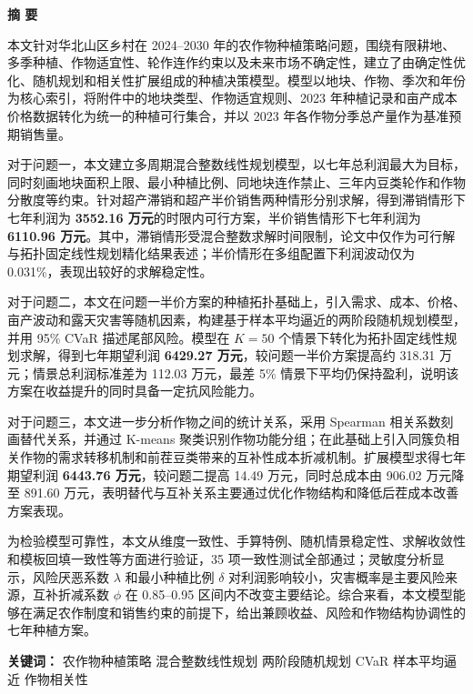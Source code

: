 \noindent\textbf{摘 要}

本文针对华北山区乡村在 2024--2030 年的农作物种植策略问题，围绕有限耕地、多季种植、作物适宜性、轮作连作约束以及未来市场不确定性，建立了由确定性优化、随机规划和相关性扩展组成的种植决策模型。模型以地块、作物、季次和年份为核心索引，将附件中的地块类型、作物适宜规则、2023 年种植记录和亩产成本价格数据转化为统一的种植可行集合，并以 2023 年各作物分季总产量作为基准预期销售量。

对于问题一，本文建立多周期混合整数线性规划模型，以七年总利润最大为目标，同时刻画地块面积上限、最小种植比例、同地块连作禁止、三年内豆类轮作和作物分散度等约束。针对超产滞销和超产半价销售两种情形分别求解，得到滞销情形下七年利润为 \textbf{3552.16 万元}的时限内可行方案，半价销售情形下七年利润为 \textbf{6110.96 万元}。其中，滞销情形受混合整数求解时间限制，论文中仅作为可行解与拓扑固定线性规划精化结果表述；半价情形在多组配置下利润波动仅为 0.031\%，表现出较好的求解稳定性。

对于问题二，本文在问题一半价方案的种植拓扑基础上，引入需求、成本、价格、亩产波动和露天灾害等随机因素，构建基于样本平均逼近的两阶段随机规划模型，并用 95\% CVaR 描述尾部风险。模型在 $K=50$ 个情景下转化为拓扑固定线性规划求解，得到七年期望利润 \textbf{6429.27 万元}，较问题一半价方案提高约 318.31 万元；情景总利润标准差为 112.03 万元，最差 5\% 情景下平均仍保持盈利，说明该方案在收益提升的同时具备一定抗风险能力。

对于问题三，本文进一步分析作物之间的统计关系，采用 Spearman 相关系数刻画替代关系，并通过 K-means 聚类识别作物功能分组；在此基础上引入同簇负相关作物的需求转移机制和前茬豆类带来的互补性成本折减机制。扩展模型求得七年期望利润 \textbf{6443.76 万元}，较问题二提高 14.49 万元，同时总成本由 906.02 万元降至 891.60 万元，表明替代与互补关系主要通过优化作物结构和降低后茬成本改善方案表现。

为检验模型可靠性，本文从维度一致性、手算特例、随机情景稳定性、求解收敛性和模板回填一致性等方面进行验证，35 项一致性测试全部通过；灵敏度分析显示，风险厌恶系数 $\lambda$ 和最小种植比例 $\delta$ 对利润影响较小，灾害概率是主要风险来源，互补折减系数 $\phi$ 在 0.85--0.95 区间内不改变主要结论。综合来看，本文模型能够在满足农作制度和销售约束的前提下，给出兼顾收益、风险和作物结构协调性的七年种植方案。

\vspace{0.8em}
\noindent\textbf{关键词：} 农作物种植策略 \quad 混合整数线性规划 \quad 两阶段随机规划 \quad CVaR \quad 样本平均逼近 \quad 作物相关性
\newpage
